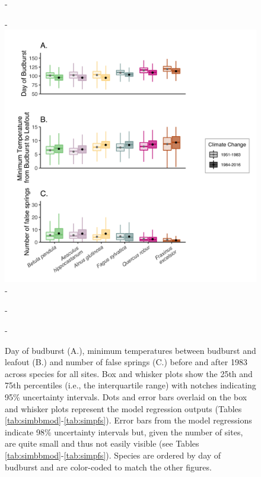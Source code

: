 \documentclass{article}\usepackage[]{graphicx}\usepackage[]{color}
\begin{document}
{\begin{figure} [H]
  -\begin{center}
  -\includegraphics[width=14cm]{..//analyses/figures/Boxplot_BBTminFS_noDots_modests.png}
  -\caption{Day of budburst (A.), minimum temperatures between budburst and leafout (B.) and number of false springs (C.) before and after 1983 across species for all sites. Box and whisker plots show the 25th and 75th percentiles (i.e., the interquartile range) with notches indicating 95\% uncertainty intervals. Dots and error bars overlaid on the box and whisker plots represent the model regression outputs (Tables \ref{tab:simbbmod}-\ref{tab:simpfs}). Error bars from the model regressions indicate 98\% uncertainty intervals but, given the number of sites, are quite small and thus not easily visible (see Tables \ref{tab:simbbmod}-\ref{tab:simpfs}). Species are ordered by day of budburst and are color-coded to match the other figures.  }\label{fig:boxfs}
  -\end{center}
  -\end{figure}}
  
\end{document}
